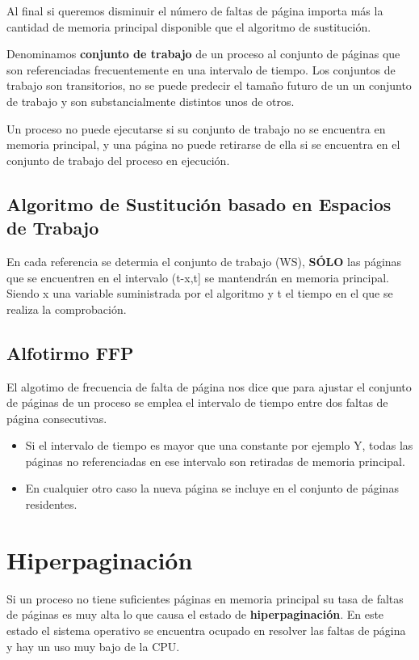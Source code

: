 Al final si queremos disminuir el número de faltas de página importa más la cantidad de memoria principal disponible que el algoritmo de sustitución.

Denominamos \textbf{conjunto de trabajo} de un proceso al conjunto de páginas que son referenciadas frecuentemente en una intervalo de tiempo. Los conjuntos de trabajo son transitorios, no se puede predecir el tamaño futuro de un un conjunto de trabajo y son substancialmente distintos unos de otros.

Un proceso no puede ejecutarse si su conjunto de trabajo no se encuentra en memoria principal, y una página no puede retirarse de ella si se encuentra en el conjunto de trabajo del proceso en ejecución.

\subsection*{Algoritmo de Sustitución basado en Espacios de Trabajo}
En cada referencia se determia el conjunto de trabajo (WS), \textbf{SÓLO} las páginas que se encuentren en el intervalo (t-x,t] se mantendrán en memoria principal. Siendo x una variable suministrada por el algoritmo y t el tiempo en el que se realiza la comprobación.

\subsection*{Alfotirmo FFP}
El algotimo de frecuencia de falta de página nos dice que para ajustar el conjunto de páginas de un proceso se emplea el intervalo de tiempo entre dos faltas de página consecutivas.

\begin{itemize}
	\item Si el intervalo de tiempo es mayor que una constante por ejemplo Y, todas las páginas no referenciadas en ese intervalo son retiradas de memoria principal.
	\item En cualquier otro caso la nueva página se incluye en el conjunto de páginas residentes.
\end{itemize}

\section*{Hiperpaginación}
Si un proceso no tiene suficientes páginas en memoria principal su tasa de faltas de páginas es muy alta lo que causa el estado de \textbf{hiperpaginación}. En este estado el sistema operativo se encuentra ocupado en resolver las faltas de página y hay un uso muy bajo de la CPU.

